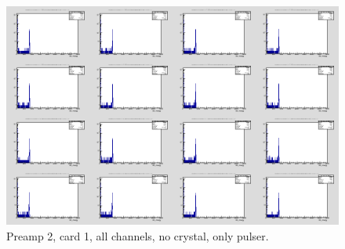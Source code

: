 \documentclass{report}
\begin{document}
\begin{figure}[!htb]
  \includegraphics[width=\linewidth]{preamp2_lim_energy_card1_all.png}
  \caption{Preamp 2, card 1, all channels, no crystal, only pulser.}
\end{figure}
\end{document}
